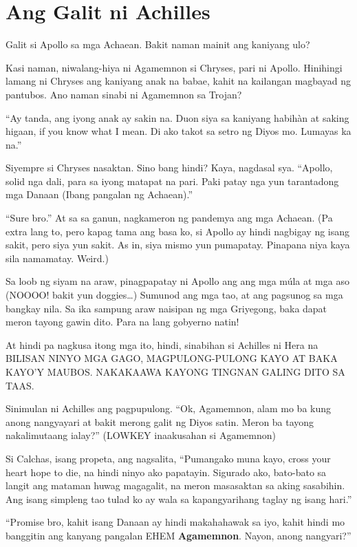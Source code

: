 \documentclass[12pt,letterpaper]{report}
\begin{document}
\chapter{Ang Galit ni Achilles}

Galit si Apollo sa mga Achaean. Bakit naman mainit ang kaniyang ulo?


Kasi naman, niwalang-hiya ni Agamemnon si Chryses, pari ni Apollo. Hinihingi lamang ni Chryses ang kaniyang anak na babae, kahit na kailangan magbayad ng pantubos. Ano naman sinabi ni Agamemnon sa Trojan?

``Ay tanda, ang iyong anak ay sakin na. Duon siya sa kaniyang habih\`{a}n at saking higaan, if you know what I mean. Di ako takot sa setro ng Diyos mo. Lumayas ka na.''

Siyempre si Chryses nasaktan. Sino bang hindi? Kaya, nagdasal sya. ``Apollo, solid nga dali, para sa iyong matapat na pari. Paki patay nga yun tarantadong mga Danaan (Ibang pangalan ng Achaean).''

``Sure bro.'' At sa sa ganun, nagkameron ng pandemya ang mga Achaean. (Pa extra lang to, pero kapag tama ang basa ko, si Apollo ay hindi nagbigay ng isang sakit, pero siya yun sakit. As in, siya mismo yun pumapatay. Pinapana niya kaya sila namamatay. Weird.)

Sa loob ng siyam na araw, pinagpapatay ni Apollo ang ang mga m\'{u}la at mga aso (NOOOO! bakit yun doggies\dots) Sumunod ang mga tao, at ang pagsunog sa mga bangkay nila. Sa ika sampung araw naisipan ng mga Griyegong, baka dapat meron tayong gawin dito. Para na lang gobyerno natin!

At hindi pa nagkusa itong mga ito, hindi, sinabihan si Achilles ni Hera na BILISAN NINYO MGA GAGO, MAGPULONG-PULONG KAYO AT BAKA KAYO'Y MAUBOS. NAKAKAAWA KAYONG TINGNAN GALING DITO SA TAAS.

Sinimulan ni Achilles ang pagpupulong. ``Ok, Agamemnon, alam mo ba kung anong nangyayari at bakit merong galit ng Diyos satin. Meron ba tayong nakalimutaang ialay?'' (LOWKEY inaakusahan si Agamemnon)

Si Calchas, isang propeta, ang nagsalita, ``Pumangako muna kayo, cross your heart hope to die, na hindi ninyo ako papatayin. Sigurado ako, bato-bato sa langit ang mataman huwag magagalit, na meron masasaktan sa aking sasabihin. Ang isang simpleng tao tulad ko ay wala sa kapangyarihang taglay ng isang hari.''

``Promise bro, kahit isang Danaan ay hindi makahahawak sa iyo, kahit hindi mo banggitin ang kanyang pangalan EHEM \textbf{Agamemnon}. Nayon, anong nangyari?''
\end{document}
